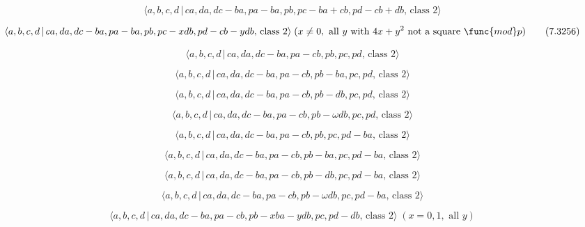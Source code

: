 \documentclass[10pt]{article}
\begin{document}
\begin{equation}
\langle a,b,c,d\,|\,ca,da,dc-ba,pa-ba,pb,pc-ba+cb,pd-cb+db,\,\text{class }%
2\rangle  \tag{7.3255}
\end{equation}

\begin{equation}
\langle a,b,c,d\,|\,ca,da,dc-ba,pa-ba,pb,pc-xdb,pd-cb-ydb,\,\text{class }%
2\rangle \;(x\neq 0,\text{ all }y\text{ with }4x+y^{2}\text{ not a square }%
\func{mod}p)  \tag{7.3256}
\end{equation}

\begin{equation}
\langle a,b,c,d\,|\,ca,da,dc-ba,pa-cb,pb,pc,pd,\,\text{class }2\rangle 
\tag{7.3257}
\end{equation}

\begin{equation}
\langle a,b,c,d\,|\,ca,da,dc-ba,pa-cb,pb-ba,pc,pd,\,\text{class }2\rangle 
\tag{7.3258}
\end{equation}

\begin{equation}
\langle a,b,c,d\,|\,ca,da,dc-ba,pa-cb,pb-db,pc,pd,\,\text{class }2\rangle 
\tag{7.3259}
\end{equation}

\begin{equation}
\langle a,b,c,d\,|\,ca,da,dc-ba,pa-cb,pb-\omega db,pc,pd,\,\text{class }%
2\rangle  \tag{7.3260}
\end{equation}

\begin{equation}
\langle a,b,c,d\,|\,ca,da,dc-ba,pa-cb,pb,pc,pd-ba,\,\text{class }2\rangle 
\tag{7.3261}
\end{equation}

\begin{equation}
\langle a,b,c,d\,|\,ca,da,dc-ba,pa-cb,pb-ba,pc,pd-ba,\,\text{class }2\rangle
\tag{7.3262}
\end{equation}

\begin{equation}
\langle a,b,c,d\,|\,ca,da,dc-ba,pa-cb,pb-db,pc,pd-ba,\,\text{class }2\rangle
\tag{7.3263}
\end{equation}

\begin{equation}
\langle a,b,c,d\,|\,ca,da,dc-ba,pa-cb,pb-\omega db,pc,pd-ba,\,\text{class }%
2\rangle  \tag{7.3264}
\end{equation}

\begin{equation}
\langle a,b,c,d\,|\,ca,da,dc-ba,pa-cb,pb-xba-ydb,pc,pd-db,\,\text{class }%
2\rangle \;(x=0,1,\text{ all }y)  \tag{7.3265}
\end{equation}
\end{document}
